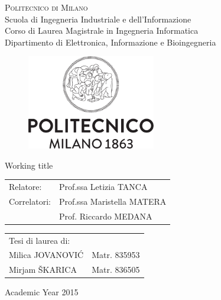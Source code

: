 \begin{titlepage}

\begin{center}
\Large{\textsc{Politecnico di Milano}}\\
\Large{Scuola di Ingegneria Industriale e dell'Informazione}\\
\large{Corso di Laurea Magistrale in Ingegneria Informatica}\\
\large{Dipartimento di Elettronica, Informazione e Bioingegneria}
\par\end{center}

\vspace{0.5cm}


\begin{center}
\begin{figure}[h]
\centering{}\includegraphics[width=0.5\textwidth]{00-frontpage/logo-polimi.png}
\end{figure}
\vspace{1cm}

\par\end{center}

\begin{center}
\LARGE{Working title}\vspace{2cm}

\par\end{center}

\begin{flushleft}
\begin{tabular}{ll}
Relatore:  & Prof.ssa Letizia TANCA\tabularnewline
Correlatori:  & Prof.ssa Maristella MATERA\tabularnewline
	& Prof. Riccardo MEDANA
\end{tabular}\vspace{1cm}

\par\end{flushleft}

\begin{flushright}
\begin{tabular}{ll}
Tesi di laurea di: & \tabularnewline
Milica JOVANOVI\'{C} & Matr. 835953\tabularnewline
Mirjam \v{S}KARICA & Matr. 836505\tabularnewline
\end{tabular}\vspace{2.2cm}

\par\end{flushright}

\begin{center}
{\large{}Academic Year 2015}
\par\end{center}{\large \par}

\end{titlepage}
